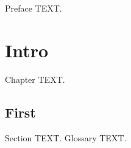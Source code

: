 \documentclass[graybox,envcountchap]{svmono}
\begin{document}
\frontmatter
\preface

Preface TEXT.

\mainmatter
\chapter{Intro}
Chapter TEXT.
\section{First}
Section TEXT.
\backmatter
{}
Glossary TEXT.
\end{document}
